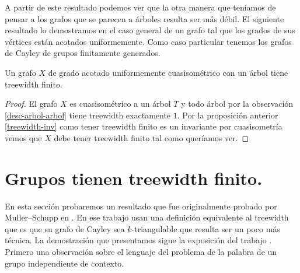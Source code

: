 \documentclass[tesis.tex]{subfiles}
\begin{document}
%	

A partir de este resultado podemos ver que la otra manera que teníamos de pensar a los grafos que se parecen a árboles resulta ser más débil. 
El siguiente resultado lo demostramos en el caso general de un grafo tal que los grados de sus vértices están acotados uniformemente. 
Como caso particular tenemos los grafos de Cayley de grupos finitamente generados.


\begin{prop} 
	Un grafo $X$ de grado acotado uniformemente cuasisométrico con un árbol tiene treewidth finito.
\end{prop}
\begin{proof}	
	El grafo $X$ es cuasisométrico a un árbol $T$ y todo árbol por la observación \ref{desc-arbol-arbol} tiene treewidth exactamente $1$.
	Por la proposición anterior \ref{treewidth-inv} como tener treewidth finito es un invariante por cuasisometría vemos que $X$ debe tener treewidth finito tal como queríamos ver.
\end{proof}

\section{Grupos \ic tienen treewidth finito.}\label{secc_MuSch}

En esta sección probaremos un resultado que fue originalmente probado por Muller--Schupp en \cite{muller1985theory}.
En ese trabajo usan una definición equivalente al treewidth que es que su grafo de Cayley sea $k$-triangulable que resulta ser un poco más técnica.
La demostración que presentamos sigue la exposición del trabajo \cite{diekert2017context}.
Primero una observación sobre el lenguaje del problema de la palabra de un grupo independiente de contexto.
\end{document}
